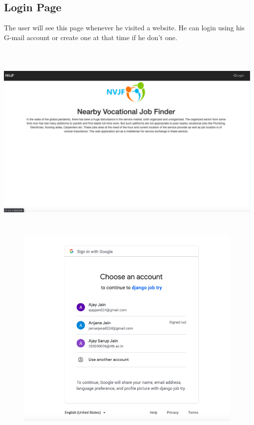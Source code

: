 \documentclass[a4paper 12pt]{article}
\begin{document}
\subsection{Login Page}
The user will see this page whenever he visited a website. He can login using his G-mail account or create one at that time if he don't one.
\vspace{15mm}
\begin{center}
\includegraphics[width=15cm, height=10cm]{sign_in.png}
\includegraphics[width=15cm, height=10cm]{google.png}
\end{center}

\newpage
\end{document}

